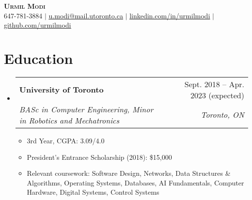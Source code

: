 \documentclass[letterpaper,11pt]{article}
\makeatletter
\newcommand{\resumeItem}[1]{
  \item\small{
    {#1 \vspace{-2pt}}
  }
}
\newcommand{\resumeSubheading}[4]{
  \vspace{-2pt}\item
    \begin{tabular*}{0.97\textwidth}[t]{l@{\extracolsep{\fill}}r}
      \textbf{#1} & #2 \\
      \textit{\small#3} & \textit{\small #4} \\
    \end{tabular*}\vspace{-7pt}
}
\newcommand{\resumeSubHeadingListStart}{\begin{itemize}[leftmargin=0.15in, label={}]}
\newcommand{\resumeSubHeadingListEnd}{\end{itemize}}
\newcommand{\resumeItemListStart}{\begin{itemize}}
\newcommand{\resumeItemListEnd}{\end{itemize}\vspace{-5pt}}
\makeatother
\begin{document}

\begin{center}
    \textbf{\Huge \scshape Urmil Modi} \\ \vspace{1pt}
    \small \faPhone {} 647-781-3884 $|$ \href{mailto:u.modi@mail.utoronto.ca}{\faEnvelope {} \underline{u.modi@mail.utoronto.ca}} $|$ 
    \href{https://linkedin.com/in/urmilmodi}{\faLinkedin {} \underline{linkedin.com/in/urmilmodi}} $|$
    \href{https://github.com/urmilmodi}{\faGithub {} \underline{github.com/urmilmodi}}
\end{center}


\section{Education}
    \resumeSubHeadingListStart
        \resumeSubheading
            {University of Toronto}{Sept. 2018 -- Apr. 2023 (expected)}
            {BASc in Computer Engineering, Minor in Robotics and Mechatronics}{Toronto, ON}
            \resumeItemListStart
                \resumeItem{3rd Year, CGPA: 3.09/4.0}
                \resumeItem{President's Entrance Scholarship (2018): \$15,000}
                \resumeItem{Relevant coursework: 
                    Software Design, 
                    Networks, 
                    Data Structures \& Algorithms, 
                    Operating Systems, 
                    Databases, 
                    AI Fundamentals, 
                    Computer Hardware, 
                    Digital Systems, 
                    Control Systems
                    }
            \resumeItemListEnd
    \resumeSubHeadingListEnd
    

%
\end{document}
